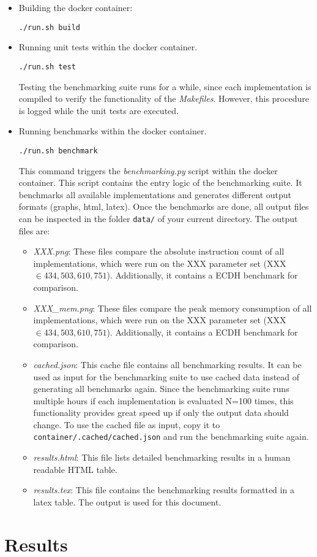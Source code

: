 \begin{itemize}
\item Building the docker container:
\begin{lstlisting}[numbers=none,linewidth=4cm]
./run.sh build
\end{lstlisting}

\item Running unit tests within the docker container.
\begin{lstlisting}[numbers=none,linewidth=4cm]
./run.sh test
\end{lstlisting}
Testing the benchmarking suite runs for a while, since each implementation is compiled to verify the functionality of the \textit{Makefiles}. However, this procedure is logged while the unit tests are executed.

\item Running benchmarks within the docker container.
\begin{lstlisting}[numbers=none,linewidth=4cm]
./run.sh benchmark
\end{lstlisting}
This command triggers the \textit{benchmarking.py} script within the docker container. This script contains the entry logic of the benchmarking suite. It benchmarks all available implementations and generates different output formats (graphs, html, latex). Once the benchmarks are done, all output files can be inspected in the folder \texttt{data/} of your current directory. The output files are:
	\begin{itemize}
	\item \textit{XXX.png}: These files compare the absolute instruction count of all implementations, which were run on the XXX parameter set (XXX $\in {434, 503, 610, 751}$). Additionally, it contains a ECDH benchmark for comparison.
	\item \textit{XXX\_mem.png}: These files compare the peak memory consumption of all implementations, which were run on the XXX parameter set (XXX $\in {434, 503, 610, 751}$). Additionally, it contains a ECDH benchmark for comparison.

	\item \textit{cached.json}: This cache file contains all benchmarking results. It can be used as input for the benchmarking suite to use cached data instead of generating all benchmarks again. Since the benchmarking suite runs multiple hours if each implementation is evaluated N=100 times, this functionality provides great speed up if only the output data should change. To use the cached file as input, copy it to \texttt{container/.cached/cached.json} and run the benchmarking suite again.
	
	\item \textit{results.html}: This file lists detailed benchmarking results in a human readable HTML table. 
	
	\item \textit{results.tex}: This file contains the benchmarking results formatted in a latex table. The output is used for this document.
	\end{itemize}

\end{itemize}
\section{Results}
